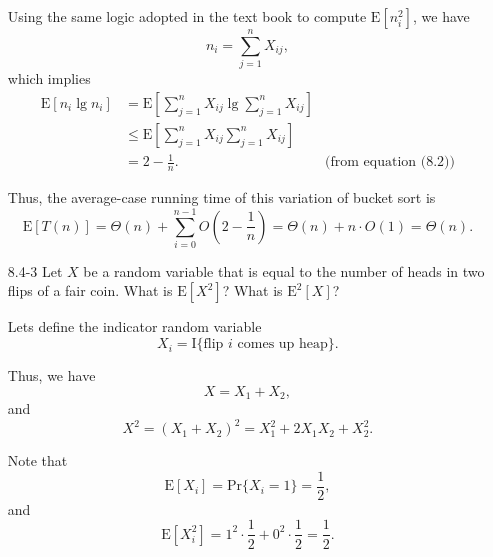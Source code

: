 \begin{enumerate}
\begin{framed}
Using the same logic adopted in the text book to compute $\text{E}[n_i^2]$, we
have
\[
  n_i = \sum_{j = 1}^{n} X_{ij},
\]
which implies
\begin{equation*}
\begin{aligned}
  \text{E}[n_i \lg n_i] &=   \text{E}\left[ \sum_{j = 1}^{n} X_{ij} \lg \sum_{j = 1}^{n} X_{ij} \right]\\
                        &\le \text{E}\left[ \sum_{j = 1}^{n} X_{ij} \sum_{j = 1}^{n} X_{ij} \right]\\
                        &=   2 - \frac{1}{n}. & \text{(from equation (8.2))}
\end{aligned}
\end{equation*}

Thus, the average-case running time of this variation of bucket sort is
\[
  \text{E}[T(n)] = \Theta(n) + \sum_{i = 0}^{n - 1} O\left(2 - \frac{1}{n}\right)
                 = \Theta(n) + n \cdot O\left(1\right)
                 = \Theta(n).
\]
\end{framed}

\newpage

\item[8.4-3]{Let $X$ be a random variable that is equal to the number of heads
in two flips of a fair coin. What is $\text{E}[X^2]$? What is $\text{E}^2[X]$?}

\begin{framed}
Lets define the indicator random variable
\[
  X_i = \text{I}\{\text{flip } i \text{ comes up heap}\}.
\]

Thus, we have
\[
  X = X_1 + X_2,
\]
and
\[
  X^2 = (X_1 + X_2)^2 = X_1^2 + 2 X_1 X_2 + X_2^2.
\]

Note that
\[
  \text{E}[X_i] = \text{Pr}\{X_i = 1\} = \frac{1}{2},
\]
and
\[
  \text{E}[X_i^2] = 1^2 \cdot \frac{1}{2} + 0^2 \cdot \frac{1}{2} = \frac{1}{2}.
\]


\end{framed}
\end{enumerate}
